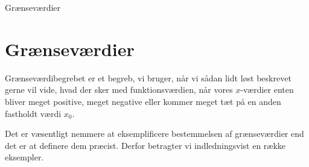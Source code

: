 \begin{center}
	\Huge
	Grænseværdier
\end{center}

\section*{Grænseværdier}

Grænseværdibegrebet er et begreb, vi bruger, når vi sådan lidt løst beskrevet gerne vil vide, hvad der sker med  funktionsværdien, når vores $x$-værdier enten bliver meget positive, meget negative eller kommer meget tæt på en anden fastholdt værdi $x_0$. 

Det er væsentligt nemmere at eksemplificere bestemmelsen af grænseværdier end det er at definere dem præcist. Derfor betragter vi indledningsvist en række eksempler.

